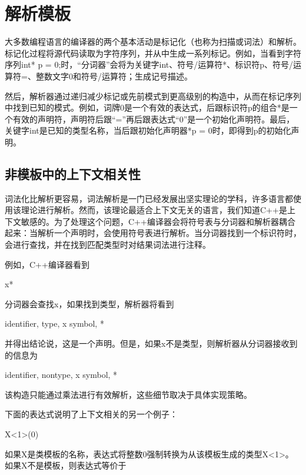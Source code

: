 \section{解析模板}

大多数编程语言的编译器的两个基本活动是标记化（也称为扫描或词法）和解析。标记化过程将源代码读取为字符序列，并从中生成一系列标记。例如，当看到字符序列int* p = 0;时，“分词器”会将为关键字int、符号/运算符*、标识符p、符号/运算符=、整数文字0和符号/运算符；生成记号描述。

然后，解析器通过递归减少标记或先前模式到更高级别的构造中，从而在标记序列中找到已知的模式。例如，词牌0是一个有效的表达式，后跟标识符p的组合*是一个有效的声明符，声明符后跟“=”再后跟表达式“0”是一个初始化声明符。最后，关键字int是已知的类型名称，当后跟初始化声明器*p = 0时，即得到p的初始化声明。

\subsection{非模板中的上下文相关性}

词法化比解析更容易，词法解析是一门已经发展出坚实理论的学科，许多语言都使用该理论进行解析。然而，该理论最适合上下文无关的语言，我们知道C++是上下文敏感的。为了处理这个问题，C++编译器会将符号表与分词器和解析器耦合起来：当解析一个声明时，会使用符号表进行解析。当分词器找到一个标识符时，会进行查找，并在找到匹配类型时对结果词法进行注释。

例如，C++编译器看到

\begin{cpp}
x*
\end{cpp}

分词器会查找x，如果找到类型，解析器将看到

\begin{cpp}
identifier, type, x
symbol, *
\end{cpp}

并得出结论说，这是一个声明。但是，如果x不是类型，则解析器从分词器接收到的信息为

\begin{cpp}
identifier, nontype, x
symbol, *
\end{cpp}

该构造只能通过乘法进行有效解析，这些细节取决于具体实现策略。

下面的表达式说明了上下文相关的另一个例子：

\begin{cpp}
X<1>(0)
\end{cpp}

如果X是类模板的名称，表达式将整数0强制转换为从该模板生成的类型X<1>。如果X不是模板，则表达式等价于

